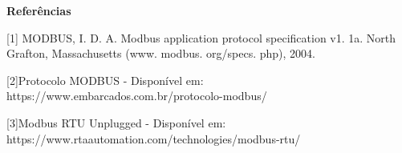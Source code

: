 \begin{center}
	\Large \textbf{Referências}
\end{center}
	
[1] MODBUS, I. D. A. Modbus application protocol specification v1. 1a. North Grafton, Massachusetts (www. modbus. org/specs. php), 2004.

[2]Protocolo MODBUS - Disponível em: https://www.embarcados.com.br/protocolo-modbus/

[3]Modbus RTU Unplugged - Disponível em: https://www.rtaautomation.com/technologies/modbus-rtu/
